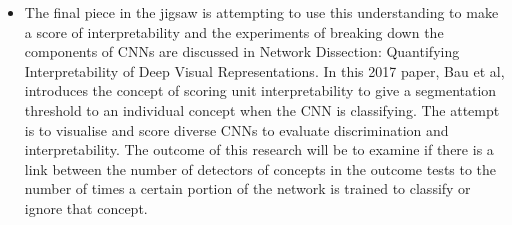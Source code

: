 \begin{itemize}
\begin{itemize}
        \item The final piece in the jigsaw is attempting to use this understanding to make a score of interpretability and the experiments of breaking down the components of CNNs are discussed in Network Dissection: Quantifying Interpretability of Deep Visual Representations. In this 2017 paper, Bau et al, introduces the concept of scoring unit interpretability to give a segmentation threshold to an individual concept when the CNN is classifying. The attempt is to visualise and score diverse CNNs to evaluate discrimination and interpretability. The outcome of this research will be to examine if there is a link between the number of detectors of concepts in the outcome tests to the number of times a certain portion of the network is trained to classify or ignore that concept.
 
    \end{itemize}
\end{itemize}


